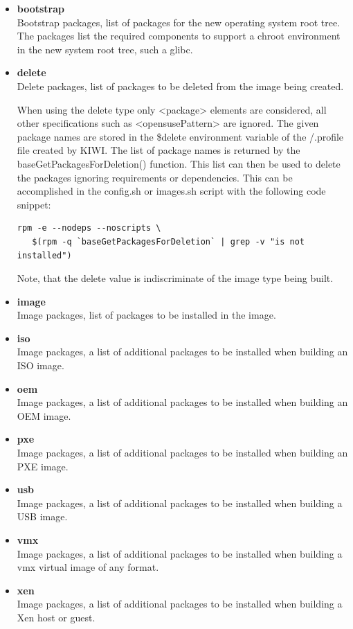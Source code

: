 \begin{itemize}
\item \textbf{bootstrap}\\
      Bootstrap packages, list of packages for the new operating system
      root tree. The packages list the required components to support a 
      chroot environment in the new system root tree, such a glibc.
\item \textbf{delete}\\
      Delete packages, list of packages to be deleted from the image being
      created.

      When using the delete type only <package> elements are considered, all
      other specifications such as <opensusePattern> are ignored. The given
      package names are stored in the \$delete environment variable of the 
      /.profile file created by KIWI. The list of package names is returned 
      by the baseGetPackagesForDeletion() function. This list can then be
      used to delete the packages ignoring requirements or dependencies. 
      This can be accomplished in the config.sh or images.sh script with
      the following code snippet:
\begin{verbatim}
rpm -e --nodeps --noscripts \
   $(rpm -q `baseGetPackagesForDeletion` | grep -v "is not installed")
\end{verbatim}
      Note, that the delete value is indiscriminate of the image type
      being built.
\item \textbf{image}\\
      Image packages, list of packages to be installed in the image.
\item \textbf{iso}\\
      Image packages, a list of additional packages to be installed 
      when building an ISO image.
\item \textbf{oem}\\
      Image packages, a list of additional packages to be installed 
      when building an OEM image.
\item \textbf{pxe}\\
      Image packages, a list of additional packages to be installed 
      when building an PXE image.
\item \textbf{usb}\\
      Image packages, a list of additional packages to be installed 
      when building a USB image.
\item \textbf{vmx}\\
      Image packages, a list of additional packages to be installed 
      when building a vmx virtual image of any format.
\item \textbf{xen}\\
      Image packages, a list of additional packages to be installed 
      when building a Xen host or guest.
\end{itemize}

